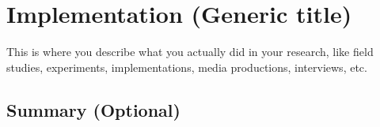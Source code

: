 \chapter{Implementation (Generic title)}
\label{chap:implementation} 

This is where you describe what you actually did in your research, like field studies, experiments, implementations, media productions, interviews, etc.



\lipsum[81-99]

\section{Summary (Optional)}